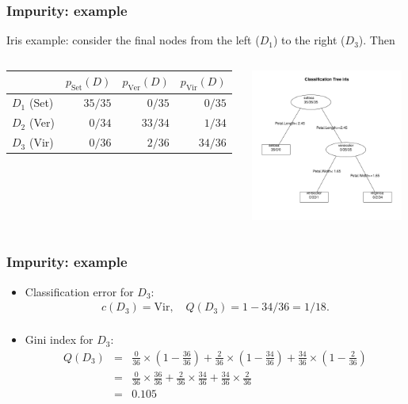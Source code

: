 \begin{frame}
\frametitle{Impurity: example}
Iris example: consider the final nodes from the left ($D_1$) to the right ($D_3$). Then
\begin{columns}
\begin{column}{0.5\textwidth}
\scriptsize
\begin{tabular}{|l|r|r|r|}
\hline
& $p_{\mbox{Set}}(D)$ & $p_{\mbox{Ver}}(D)$ & $p_{\mbox{Vir}}(D)$ \\
\hline
$D_1$ (Set) & $35/35$ & $0/35$ & $0/35$\\
\hline
$D_2$ (Ver) & $0/34$ & $33/34$ & $1/34$\\
\hline
$D_3$ (Vir) & $0/36$ & $2/36$ & $34/36$\\
\hline
\end{tabular}
\normalsize
\end{column}
\begin{column}{0.5\textwidth}
\begin{center}
\includegraphics[width=5cm]{../../Graphs/IRIS_CART.png}
\end{center}
\end{column}
\end{columns}
\end{frame}
\begin{frame}
\frametitle{Impurity: example}
\begin{itemize}
\item Classification error for $D_3$:  
\begin{eqnarray*}
c(D_3)= \mbox{Vir}, \quad Q(D_3)= 1 - 34/36 = 1/18.\\
\end{eqnarray*}
\item Gini index for $D_3$:
\begin{eqnarray*}
Q(D_3)&=& \frac{0}{36}\times\left(1-\frac{36}{36}\right) + \frac{2}{36}\times\left(1-\frac{34}{36}\right) + \frac{34}{36}\times \left(1-\frac{2}{36}\right)\\
&=& \frac{0}{36}\times\frac{36}{36} + \frac{2}{36}\times\frac{34}{36} + \frac{34}{36}\times\frac{2}{36}\\
&=& 0.105\\
\end{eqnarray*}
\end{itemize}
\end{frame}
